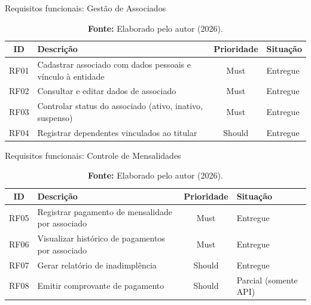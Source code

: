 \documentclass[12pt,a4paper]{article}
\begin{document}
\begin{table}[H]
  \centering
  \caption{Requisitos funcionais: Gestão de Associados}
  \label{tab:rf-associados}
  \begin{tabular}{@{}cL{7.4cm}cL{3.2cm}@{}}
    \toprule
    \textbf{ID} & \textbf{Descrição} & \textbf{Prioridade} & \textbf{Situação} \\
    \midrule
    RF01 & Cadastrar associado com dados pessoais e vínculo à entidade & Must   & Entregue \\
    RF02 & Consultar e editar dados de associado                        & Must   & Entregue \\
    RF03 & Controlar status do associado (ativo, inativo, suspenso)     & Must   & Entregue \\
    RF04 & Registrar dependentes vinculados ao titular                  & Should & Entregue \\
    \bottomrule
  \end{tabular}
  \caption*{\textbf{Fonte:} Elaborado pelo autor (2026).}
\end{table}

\begin{table}[H]
  \centering
  \caption{Requisitos funcionais: Controle de Mensalidades}
  \label{tab:rf-mensalidades}
  \begin{tabular}{@{}cL{7.4cm}cL{3.2cm}@{}}
    \toprule
    \textbf{ID} & \textbf{Descrição} & \textbf{Prioridade} & \textbf{Situação} \\
    \midrule
    RF05 & Registrar pagamento de mensalidade por associado & Must   & Entregue \\
    RF06 & Visualizar histórico de pagamentos por associado & Must   & Entregue \\
    RF07 & Gerar relatório de inadimplência                 & Should & Entregue \\
    RF08 & Emitir comprovante de pagamento                  & Should & Parcial (somente API) \\
    \bottomrule
  \end{tabular}
  \caption*{\textbf{Fonte:} Elaborado pelo autor (2026).}
\end{table}
\end{document}
